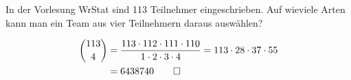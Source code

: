 In der Vorlesung WrStat sind 113 Teilnehmer eingeschrieben.
Auf wieviele Arten kann man ein Team aus vier Teilnehmern daraus
auswählen?

\begin{loesung}
\begin{align*}
\binom{113}{4}
&=
\frac{113\cdot 112\cdot 111\cdot 110}{1\cdot 2\cdot 3\cdot 4}
=
113\cdot 28 \cdot 37 \cdot 55
\\
&=
6438740
\qedhere
\end{align*}
\end{loesung}

